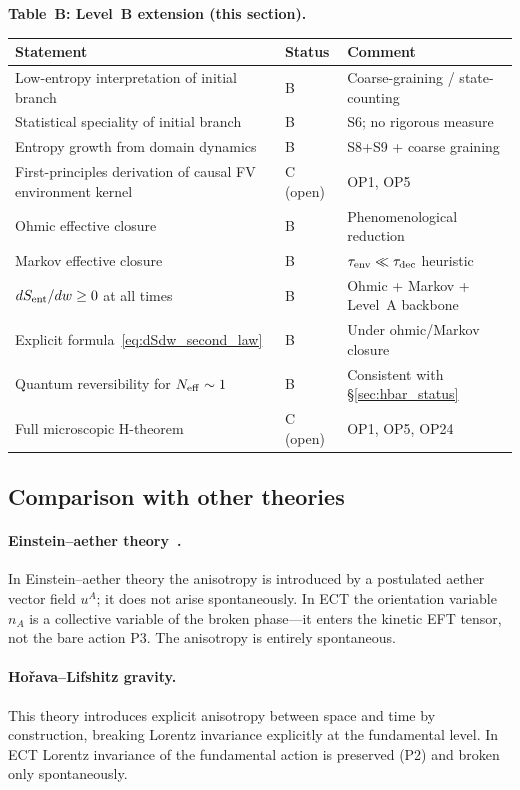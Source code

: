 \documentclass[11pt,a4paper]{article}
\numberwithin{equation}{section}
\begin{document}
\noindent\textbf{Table~B: Level~B extension (this section).}
\begin{center}
\renewcommand{\arraystretch}{1.2}
\begin{tabular}{p{6.2cm}p{2.0cm}p{4.8cm}}
\hline
Statement & Status & Comment \\
\hline
Low-entropy interpretation of initial branch
  & B & Coarse-graining / state-counting \\
Statistical speciality of initial branch
  & B & S6; no rigorous measure \\
Entropy growth from domain dynamics
  & B & S8+S9 + coarse graining \\
First-principles derivation of causal FV
  environment kernel
  & C (open) & OP1, OP5 \\
Ohmic effective closure
  & B & Phenomenological reduction \\
Markov effective closure
  & B & $\tau_{\rm env}\ll\tau_{\rm dec}$ heuristic \\
$dS_{\rm ent}/dw\geq 0$ at all times
  & B & Ohmic + Markov + Level~A backbone \\
Explicit formula~\eqref{eq:dSdw_second_law}
  & B & Under ohmic/Markov closure \\
Quantum reversibility for $N_{\rm eff}\sim1$
  & B & Consistent with \S\ref{sec:hbar_status} \\
Full microscopic H-theorem
  & C (open) & OP1, OP5, OP24 \\
\hline
\end{tabular}
\end{center}

\subsection{Comparison with other theories}
\label{sec:comparison_theories}

\paragraph{Einstein--aether theory~\cite{Jacobson2004}.}
In Einstein--aether theory the anisotropy is introduced by a postulated
aether vector field $u^A$; it does not arise spontaneously.
In ECT the orientation variable $n_A$ is a collective variable of the
broken phase---it enters the kinetic EFT tensor, not the bare action P3.
The anisotropy is entirely spontaneous.

\paragraph{Ho\v{r}ava--Lifshitz gravity.}
This theory introduces explicit anisotropy between space and time
by construction, breaking Lorentz invariance explicitly at the
fundamental level. In ECT Lorentz invariance of the fundamental
action is preserved (P2) and broken only spontaneously.
\end{document}
